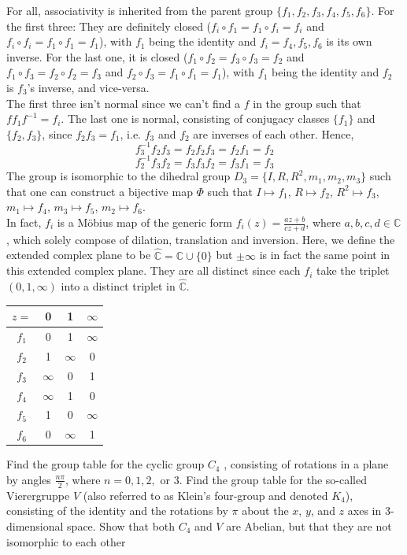 \documentclass[a4paper]{article}
\begin{document}
\begin{ans}
For all, associativity is inherited from the parent group $\{f_1,f_2,f_3,f_4,f_5,f_6\}$. For the first three: They are definitely closed ($f_i\circ f_1=f_1\circ f_i=f_i$ and $f_i\circ f_i=f_1\circ f_1=f_1$), with $f_1$ being the identity and $f_i=f_4, f_5, f_6$ is its own inverse. For the last one, it is closed ($f_1\circ f_2=f_3\circ f_3=f_2$ and $f_1\circ f_3=f_2\circ f_2=f_3$ and $f_2\circ f_3=f_1\circ f_1=f_1$), with $f_1$ being the identity and $f_2$ is $f_3$'s inverse, and vice-versa.\\[5pt]
The first three isn't normal since we can't find a $f$ in the group such that $ff_1f^{-1}=f_i$. The last one is normal, consisting of conjugacy classes $\{f_1\}$ and $\{f_2,f_3\}$, since $f_2f_3=f_1$, i.e. $f_3$ and $f_2$ are inverses of each other. Hence, $$f_3^{-1}f_2f_3=f_2f_2f_3=f_2f_1=f_2$$ $$f_2^{-1}f_3f_2=f_3f_3f_2=f_3f_1=f_3$$
The group is isomorphic to the dihedral group $D_3=\{I,R,R^2,m_1,m_2,m_3\}$ such that one can construct a bijective map $\Phi$ such that $I\mapsto f_1$, $R\mapsto f_2$, $R^2\mapsto f_3$, $m_1\mapsto f_4$, $m_3\mapsto f_5$, $m_2\mapsto f_6$.\\[5pt]
In fact, $f_i$ is a M\"{o}bius map of the generic form $f_i(z)=\frac{az+b}{cz+d}$, where $a,b,c,d\in\mathbb{C}$, which solely compose of dilation, translation and inversion. Here, we define the extended complex plane to be $\hat{\mathbb{C}}=\mathbb{C}\cup\{0\}$ but $\pm\infty$ is in fact the same point in this extended complex plane. They are all distinct since each $f_i$ take the triplet $(0,1,\infty)$ into a distinct triplet in $\hat{\mathbb{C}}$.
\begin{center}
\begin{tabular}{ |c|c|c|c| } 
\hline
    $z=$&0&1&$\infty$\\
 \hline
 $f_1$ & 0 & 1 & $\infty$ \\ 
 $f_2$ & 1 & $\infty$ & 0 \\
 $f_3$ & $\infty$ & 0 &1\\
 $f_4$ & $\infty$ & 1 & 0\\
 $f_5$ & 1 & 0 &$\infty$\\
 $f_6$& 0 &$\infty$&1\\
 \hline
\end{tabular}
\end{center}
\end{ans}
\begin{qns}
Find the group table for the cyclic group $C_4$ , consisting of rotations in a plane by angles $\frac{n\pi}{2}$, where $n = 0, 1, 2,$ or $3$. Find the group table for the so-called Vierergruppe $V$ (also referred to as Klein’s four-group and denoted $K_4$), consisting of the identity and the rotations by $\pi$ about the $x$, $y$, and $z$ axes in 3-dimensional space. Show that both $C_4$ and $V$ are Abelian, but that they are not isomorphic to each other
\end{qns}
\end{document}
